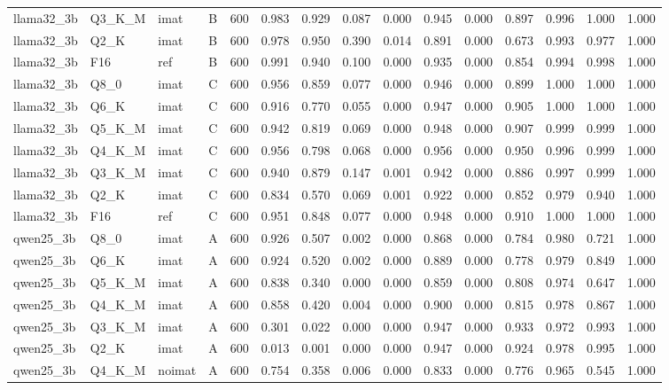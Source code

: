 \begin{tabular}{llllrrrrrrrrrrr}
llama32\_3b & Q3\_K\_M & imat & B & 600 & 0.983 & 0.929 & 0.087 & 0.000 & 0.945 & 0.000 & 0.897 & 0.996 & 1.000 & 1.000 \\
llama32\_3b & Q2\_K & imat & B & 600 & 0.978 & 0.950 & 0.390 & 0.014 & 0.891 & 0.000 & 0.673 & 0.993 & 0.977 & 1.000 \\
llama32\_3b & F16 & ref & B & 600 & 0.991 & 0.940 & 0.100 & 0.000 & 0.935 & 0.000 & 0.854 & 0.994 & 0.998 & 1.000 \\
llama32\_3b & Q8\_0 & imat & C & 600 & 0.956 & 0.859 & 0.077 & 0.000 & 0.946 & 0.000 & 0.899 & 1.000 & 1.000 & 1.000 \\
llama32\_3b & Q6\_K & imat & C & 600 & 0.916 & 0.770 & 0.055 & 0.000 & 0.947 & 0.000 & 0.905 & 1.000 & 1.000 & 1.000 \\
llama32\_3b & Q5\_K\_M & imat & C & 600 & 0.942 & 0.819 & 0.069 & 0.000 & 0.948 & 0.000 & 0.907 & 0.999 & 0.999 & 1.000 \\
llama32\_3b & Q4\_K\_M & imat & C & 600 & 0.956 & 0.798 & 0.068 & 0.000 & 0.956 & 0.000 & 0.950 & 0.996 & 0.999 & 1.000 \\
llama32\_3b & Q3\_K\_M & imat & C & 600 & 0.940 & 0.879 & 0.147 & 0.001 & 0.942 & 0.000 & 0.886 & 0.997 & 0.999 & 1.000 \\
llama32\_3b & Q2\_K & imat & C & 600 & 0.834 & 0.570 & 0.069 & 0.001 & 0.922 & 0.000 & 0.852 & 0.979 & 0.940 & 1.000 \\
llama32\_3b & F16 & ref & C & 600 & 0.951 & 0.848 & 0.077 & 0.000 & 0.948 & 0.000 & 0.910 & 1.000 & 1.000 & 1.000 \\
qwen25\_3b & Q8\_0 & imat & A & 600 & 0.926 & 0.507 & 0.002 & 0.000 & 0.868 & 0.000 & 0.784 & 0.980 & 0.721 & 1.000 \\
qwen25\_3b & Q6\_K & imat & A & 600 & 0.924 & 0.520 & 0.002 & 0.000 & 0.889 & 0.000 & 0.778 & 0.979 & 0.849 & 1.000 \\
qwen25\_3b & Q5\_K\_M & imat & A & 600 & 0.838 & 0.340 & 0.000 & 0.000 & 0.859 & 0.000 & 0.808 & 0.974 & 0.647 & 1.000 \\
qwen25\_3b & Q4\_K\_M & imat & A & 600 & 0.858 & 0.420 & 0.004 & 0.000 & 0.900 & 0.000 & 0.815 & 0.978 & 0.867 & 1.000 \\
qwen25\_3b & Q3\_K\_M & imat & A & 600 & 0.301 & 0.022 & 0.000 & 0.000 & 0.947 & 0.000 & 0.933 & 0.972 & 0.993 & 1.000 \\
qwen25\_3b & Q2\_K & imat & A & 600 & 0.013 & 0.001 & 0.000 & 0.000 & 0.947 & 0.000 & 0.924 & 0.978 & 0.995 & 1.000 \\
qwen25\_3b & Q4\_K\_M & noimat & A & 600 & 0.754 & 0.358 & 0.006 & 0.000 & 0.833 & 0.000 & 0.776 & 0.965 & 0.545 & 1.000 \\

\end{tabular}
